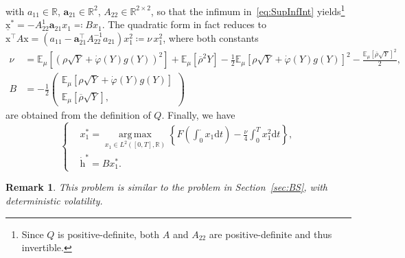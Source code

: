 \documentclass{amsart}[11pt]
\numberwithin{equation}{section}
\numberwithin{theorem}{subsection}
\numberwithin{proposition}{subsection}
\numberwithin{definition}{subsection}
\numberwithin{lemma}{subsection}
\newtheorem*{remark}{Remark}
\numberwithin{assumption}{subsection}
\newcommand{\RR}{\mathbb{R}}
\newcommand{\R}{\RR}
\newcommand{\EE}{\mathbb{E}}
\newcommand{\brho}{\overline{\rho}}
\newcommand{\D}{\mathrm{d}}
\newcommand{\hh}{\boldsymbol{\mathrm{h}}}
\newcommand{\xx}{\boldsymbol{\mathrm{x}}}
\DeclareMathOperator*{\argmax}{arg\,max}
\begin{document}
with $a_{11} \in\RR$, $\mathbf a_{21}\in\RR^{2}$, $A_{22}\in\RR^{2\times 2}$, so that the infimum in~\eqref{eq:SupInfInt} yields\footnote{Since $Q$ is positive-definite, both $A$ and $A_{22}$ are positive-definite and thus invertible.} ${\underline{\xx}^{*} = - A_{22}^{1} \mathbf a_{21} x_1 \eqqcolon B x_1}$. The quadratic form in fact reduces to ${\xx^\top A \xx = \left( a_{11} - \mathbf a_{21}^\top A_{22}^{-1} a_{21} \right ) x_1^2 \coloneqq \nu\, x_1^2}$, where both constants
\begin{equation}\label{eq:ConstPDP}
\begin{array}{rl}
\nu &=\displaystyle \EE_\mu\left[ \left( \rho\sqrt{Y} + \dot{\varphi}(Y)g(Y)\right )^2 \right ] + \EE_\mu\left [\brho^2 Y\right ] - \frac{1}{2}\EE_\mu\left[ \rho\sqrt{Y} + \dot{\varphi}(Y)g(Y)\right]^2 - \frac{\EE_\mu[\brho\sqrt{Y}]^2}{2},\\
B &=\displaystyle -\frac{1}{2}\begin{pmatrix}
\EE_\mu[\rho\sqrt{Y}+\dot{\varphi}(Y)g(Y)]\\
\EE_\mu[\brho\sqrt{Y}],
\end{pmatrix}
\end{array}
\end{equation}
are obtained from the definition of $Q$. Finally, we have
\begin{equation}\label{pb-deterministic-large}
\begin{cases}
&\displaystyle x_1^{*}=\argmax\limits_{x_1 \in L^2([0,T],\R)}
\left\{F\left(\int_{0}^{\cdot} x_1\D t\right) - \frac{\nu}{4}\int_0^T x_1^2 \D t\right\},
\\
&\dot{\hh}^{*}
= B x_1^{*}.
\end{cases}
\end{equation}
\begin{remark}
This problem is similar to the problem in Section~\ref{sec:BS}, with deterministic volatility.
\end{remark}
\end{document}
